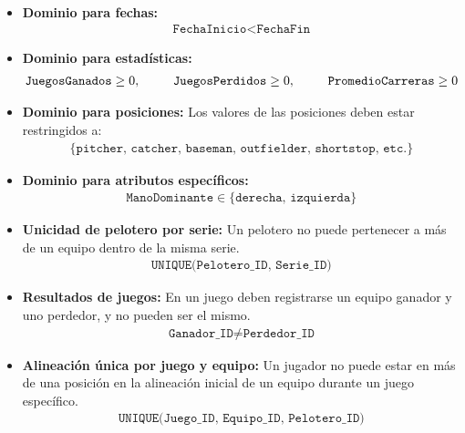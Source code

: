 \documentclass{report}
\begin{document}
    \begin{itemize}
        \item \textbf{Dominio para fechas:} 
        \begin{align*}
            \texttt{FechaInicio} < \texttt{FechaFin}
        \end{align*}

        \item \textbf{Dominio para estadísticas:} 
        \begin{align*}
            \texttt{JuegosGanados} \geq 0, \hspace*{0.9cm} \texttt{JuegosPerdidos} \geq 0, \hspace*{0.9cm} \texttt{PromedioCarreras} \geq 0
        \end{align*}

        \item \textbf{Dominio para posiciones:} Los valores de las posiciones deben estar restringidos a:
        \begin{align*}
            \{\texttt{pitcher, catcher, baseman, outfielder, shortstop, etc.}\}
        \end{align*}

        \item \textbf{Dominio para atributos específicos:} 
        \begin{align*}
            \texttt{ManoDominante} \in \{\texttt{derecha, izquierda}\}
        \end{align*}

        \item \textbf{Unicidad de pelotero por serie:} Un pelotero no puede pertenecer a más de un equipo dentro de 
        la misma serie.
        \begin{align*}
            \texttt{UNIQUE(Pelotero\_ID, Serie\_ID)}
        \end{align*}

        \item \textbf{Resultados de juegos:} En un juego deben registrarse un equipo ganador y uno perdedor, y no 
        pueden ser el mismo.
        \begin{align*}
            \texttt{Ganador\_ID} \neq \texttt{Perdedor\_ID}
        \end{align*}

        \item \textbf{Alineación única por juego y equipo:} Un jugador no puede estar en más de una posición en la 
        alineación inicial de un equipo durante un juego específico.
        \begin{align*}
            \texttt{UNIQUE(Juego\_ID, Equipo\_ID, Pelotero\_ID)}
        \end{align*}


\end{itemize}
\end{document}

